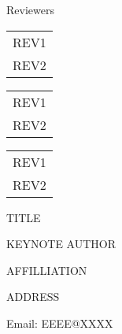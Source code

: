\documentclass[letterpaper,oneside]{book}
\begin{document}
\vspace{0.5cm}


{\Large Reviewers}
\vspace{0.2cm}

\begin{minipage}[t]{0.3\textwidth}
\vspace{0pt}   %
\begin{tabular}{l}
REV1\\
REV2\\
\end{tabular}
\end{minipage}
\hspace{0.1cm}
\begin{minipage}[t]{0.3\textwidth}
\vspace{0pt}   %
\begin{tabular}{l}
REV1\\
REV2\\
\end{tabular}
\end{minipage}
\hspace{0.1cm}
\begin{minipage}[t]{0.3\textwidth}
\vspace{0pt}   %
\begin{tabular}{l}
REV1\\
REV2\\
\end{tabular}
\end{minipage}

\newpage
%
%

\newpage
\setcounter{tocdepth}{0}
{}
\renewcommand{\contentsname}{Table of Contents}
\tableofcontents
\thispagestyle{fancy}
\newpage
\mainmatter
\setcounter{secnumdepth}{-2}
\null
{}
{}
\thispagestyle{fancy}
\begin{center}
\Huge{TITLE}

\vspace {1.1cm}

{\large KEYNOTE AUTHOR

AFFILLIATION

ADDRESS

Email: EEEE@XXXX

}
\end{center}
\end{document}
